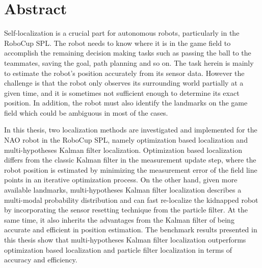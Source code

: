 \thispagestyle{empty}
\chapter*{Abstract}

Self-localization is a crucial part for autonomous robots, particularly in the RoboCup \gls{SPL}. The robot needs to know where it is in the game field to accomplish the remaining decision making tasks such as passing the ball to the teammates, saving the goal, path planning and so on. The task herein is mainly to estimate the robot's position accurately from its sensor data. However the challenge is that the robot only observes its surrounding world partially at a given time, and it is sometimes not sufficient enough to determine its exact position. In addition, the robot must also identify the landmarks on the game field which could be ambiguous in most of the cases. 

In this thesis, two localization methods are investigated and implemented for the NAO robot in the RoboCup \gls{SPL}, namely optimization based localization and multi-hypotheses Kalman filter localization.
Optimization based localization differs from the classic Kalman filter in the measurement update step, where the robot position is estimated by minimizing the measurement error of the field line points in an iterative optimization process. 
On the other hand, given more available landmarks, multi-hypotheses Kalman filter localization describes a multi-modal probability distribution and can fast re-localize the kidnapped robot by incorporating the sensor resetting technique from the particle filter. At the same time, it also inherits the advantages from the Kalman filter of being accurate and efficient in position estimation. The benchmark results presented in this thesis show that multi-hypotheses Kalman filter localization outperforms optimization based localization and particle filter localization in terms of accuracy and efficiency.
